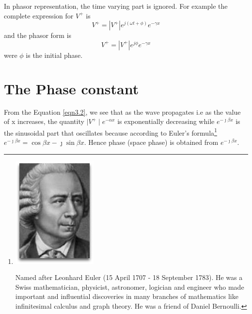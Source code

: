In phasor representation, the time varying part is ignored. For example the complete expression for $V^+$ is 
\begin{equation*}
V^+ = \left| V^+\right| e^{j(\omega t + \phi)} e^{-\gamma x} 
\end{equation*}
and the phasor form is
\begin{equation*}
V^+ = \left| V^+\right| e^{j\phi} e^{-\gamma x}
\end{equation*}
were $\phi$ is the initial phase.
\section{The Phase constant}
From the Equation \ref{eqn3.2}, we see that as the wave propagates i.e as the value of x increases, the quantity $\mid V^+\mid e^{-\alpha x}$ is exponentially decreasing while $e^{-\jmath\beta x}$ is the sinusoidal part that oscillates because according to Euler's formula\footnote{
\includegraphics[scale=0.2]{./graphics/euler}

Named after Leonhard Euler (15 April 1707 - 18 September 1783). He was a Swiss mathematician, physicist, astronomer, logician and engineer who made important and influential discoveries in many branches of mathematics like infinitesimal calculus and graph theory. He was a friend of Daniel Bernoulli.
} 
$e^{-\jmath\beta x} = \cos{\beta x} - \jmath \sin{ \beta x}$. Hence phase (space phase) is obtained from $e^{-\jmath\beta x}$.

